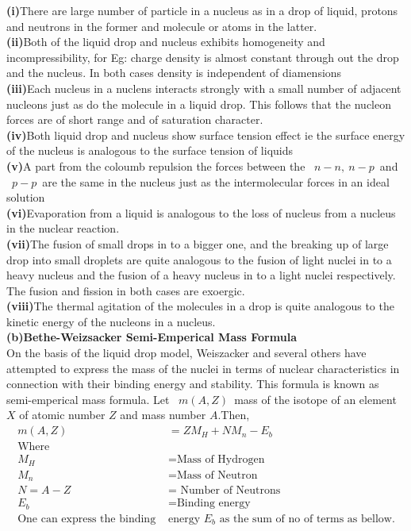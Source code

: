 \textbf{(i)}\quad There are large number of particle in a nucleus as in a drop of liquid, protons and neutrons in the former and molecule or atoms in the latter. \\

\textbf{(ii)}\quad Both of the liquid drop and nucleus exhibits homogeneity and incompressibility, for Eg: charge density is almost constant through out the drop and the nucleus. In both cases density is independent of diamensions \\

\textbf{(iii)}\quad Each nucleus in a nuclens interacts strongly with a small number of adjacent nucleons just as do the molecule in a liquid drop. This follows that the nucleon forces are of short range and of saturation character.\\

\textbf{(iv)}\quad Both liquid drop and nucleus show surface tension effect ie the surface energy of the nucleus is analogous to the surface tension of liquids \\

\textbf{(v)}\quad A part  from the coloumb repulsion the forces between the \ $n-n,\ n-p$\ and \ $p-p$\ are the same in the nucleus just as the intermolecular forces in an ideal solution\\

\textbf{(vi)}\quad Evaporation from a liquid is analogous to the loss of nucleus from a nucleus in the nuclear reaction.\\

\textbf{(vii)}\quad The fusion of small drops in to a bigger one, and the breaking up of large drop into small droplets are quite analogous to the fusion of light nuclei in to a heavy nucleus and the fusion of a heavy nucleus in to a light nuclei respectively. The fusion and fission in both cases are exoergic.\\

\textbf{(viii)}\quad The thermal agitation of the molecules in a drop is quite analogous to the kinetic energy of the nucleons in a nucleus.\\

\textbf{(b)\quad Bethe-Weizsacker Semi-Emperical Mass Formula}\\
On the basis of the liquid drop model, Weiszacker and several others have attempted to express the mass of the nuclei in terms of nuclear characteristics in connection with their binding energy and stability. This formula is known as semi-emperical mass formula. Let \ $m(A,Z)$\ mass of the isotope of an element $X$ of atomic number $Z$ and mass number $A$.Then,
\begin{align*}
m(A,Z)&=ZM_H+NM_n-E_b\\
\text{Where}\\
M_H&=\text{Mass of Hydrogen}\\
M_n&=\text{Mass of Neutron}\\
N=A-Z&=\text{ Number of Neutrons}\\
E_b&=\text{Binding energy}\\
\text{One can express the binding }&\text{energy $E_b$ as the sum of no of terms as bellow.}\\
\end{align*}

